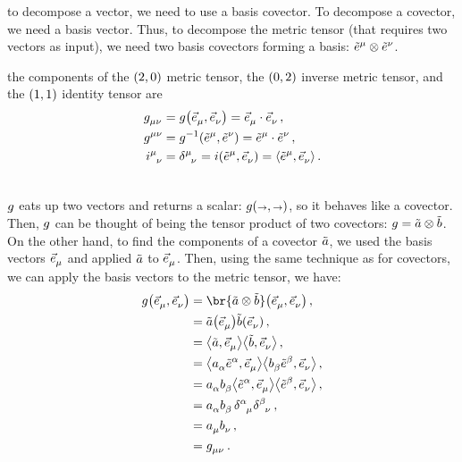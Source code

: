  to decompose a vector, we need to use a basis covector. To decompose a covector, we need a basis vector. Thus, to decompose the metric tensor (that requires two vectors as input), we need two basis covectors forming a basis: $\tbcov\mu\tprod\tbcov\nu$.

 the components of the $\torder 20$ metric tensor, the $\torder 02$ inverse metric tensor, and the $\torder 11$ identity tensor are
%
\begin{align}\label{eq:metricinversemetricidentitytensorscomponents}
  \tmetric\mu\nu &= \metric\vat{\tbvec\mu, \tbvec\nu} = \tbvec\mu\iprod\tbvec\nu \,,\\\nonumber
  \tinvmet\mu\nu &= \invmet\vat{\tbcov\mu, \tbcov\nu} = \tbcov\mu\iprod\tbcov\nu \,,\\\nonumber
  \tidtens\mu\nu &= \tkron\mu\nu = \idtens\vat{\tbcov\mu, \tbvec\nu} = \sprod{\tbcov\mu}{\tbvec\nu} \,.\\\nonumber
\end{align}

 $g$ eats up two vectors and returns a scalar: $\metric\vat{\vslot,\vslot}$, so it behaves like a covector. Then, $g$ can be thought of being the tensor product of two covectors: $g = \tilde{a}\otimes\tilde{b}$. On the other hand, to find the components of a covector $\tilde{a}$, we used the basis vectors $\tbvec\mu$ and applied $\tilde{a}$ to $\tbvec\mu$. Then, using the same technique as for covectors, we can apply the basis vectors to the metric tensor, we have:
%
\begin{align*}
  \metric\vat{\tbvec\mu,\tbvec\nu} &= \br{\cov a\tprod\cov b}\vat{\tbvec\mu,\tbvec\nu}  \,,\\
                                   &= \cov a\vat{\tbvec\mu}\cov b\vat{\tbvec\nu}        \,, \\
                                   &= \sprod{\cov a}{\tbvec\mu}\sprod{\cov b}{\tbvec\nu} \,, \\
                                   &= \sprod{\tcov a\alpha\tbcov\alpha}{\tbvec\mu}\sprod{\tcov b\beta\tbcov\beta}{\tbvec\nu} \,, \\
                                   &= \tcov a\alpha\tcov b\beta\sprod{\tbcov\alpha}{\tbvec\mu}\sprod{\tbcov\beta}{\tbvec\nu} \,, \\
                                   &= \tcov a\alpha\tcov b\beta\,\tkron\alpha\mu\tkron\beta\nu \,, \\
                                   &= \tcov a\mu\tcov b\nu  \,,\\
                                   &= \tmetric\mu\nu        \,.
\end{align*}

